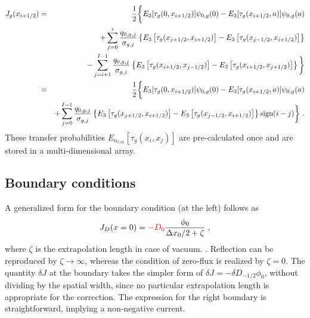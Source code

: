 \begin{eqnarray}\label{eq:tot-J-disc2-l=0}
J_g(x_{i+1/2}) &=& \frac{1}{2}
\bigg\{
E_3[\tau_g(0,x_{i+1/2})] \psi_{0,g}(0) 
- E_3[\tau_g(x_{i+1/2},a)]\psi_{0,g}(a)  \nonumber \\
&&+
\sum\limits_{j=0}^i \frac{q_{0,g,j}}{\sigma_{g,j}} 
\left\{
E_3\left[
\tau_g(x_{j+1/2},x_{i+1/2}) \right] 
- E_3\left[
\tau_g(x_{j-1/2},x_{i+1/2})
\right] 
\right\}
\nonumber \\
&&-
\sum\limits_{j=i+1}^{I-1} \frac{q_{0,g,j}}{\sigma_{g,j}} 
\left\{
E_3\left[
\tau_g(x_{i+1/2},x_{j-1/2}) \right] 
- E_3\left[
\tau_g(x_{i+1/2},x_{j+1/2})
\right]
\right\}
\bigg\}	\nonumber \\
&=&\frac{1}{2}
\bigg\{
E_3[\tau_g(0,x_{i+1/2})] \psi_{0,g}(0) 
- E_3[\tau_g(x_{i+1/2},a)]\psi_{0,g}(a)  \nonumber \\
&&+
\sum\limits_{j=0}^{I-1} \frac{q_{0,g,j}}{\sigma_{g,j}} 
\left\{
E_3\left[
\tau_g(x_{j+1/2},x_{i+1/2}) \right] 
- E_3\left[
\tau_g(x_{j-1/2},x_{i+1/2})
\right] 
\right\}\text{sign}(i-j)
\bigg\}
\,\, . 
\end{eqnarray}
These transfer probabilities $E_{n_{l,m}}[\tau_g(x_i,x_j)]$ are pre-calculated once and are stored in a multi-dimensional array.

%
\subsection{Boundary conditions}
\label{sec:BC}
A generalized form for the boundary condition (at the left) follows as
\begin{equation}\label{eq:BC}
J_D(x=0) = {\color{red}{-D_0}}\frac{\phi_0}{\Delta x_0/2 + \zeta} \,\, ,
\end{equation} 
where $\zeta$ is the extrapolation length in case of vacuum. . Reflection can be reproduced by $\zeta\rightarrow\infty$, whereas the condition of zero-flux is realized by $\zeta=0$. 
%
The quantity $\delta J$ at the boundary takes the simpler form of $\delta J = -\delta D_{-1/2}\phi_0$, without dividing by the spatial width, since no particular extrapolation length is appropriate for the correction. The expression for the right boundary is straightforward, implying a non-negative current. 

